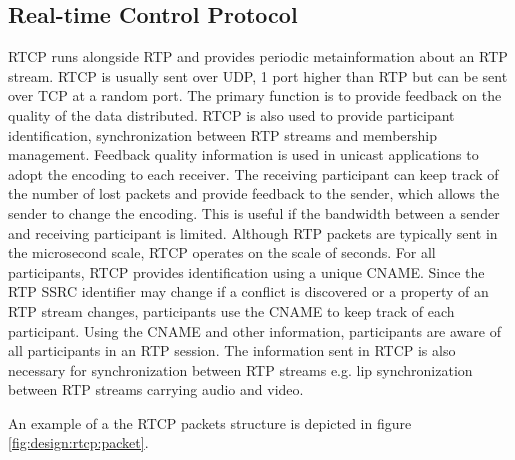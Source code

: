 \subsection{Real-time Control Protocol} \label{sec:design:rtcp}
RTCP runs alongside RTP and provides periodic metainformation about an RTP stream. RTCP is usually sent over UDP, 1 port higher than RTP but can be sent over TCP at a random port. The primary function is to provide feedback on the quality of the data distributed. RTCP is also used to provide participant identification, synchronization between RTP streams and membership management. Feedback quality information is used in unicast applications to adopt the encoding to each receiver. The receiving participant can keep track of the number of lost packets and provide feedback to the sender, which allows the sender to change the encoding. This is useful if the bandwidth between a sender and receiving participant is limited.  Although RTP packets are typically sent in the microsecond scale, RTCP operates on the scale of seconds.
For all participants, RTCP provides identification using a unique \ac{CNAME}.
Since the RTP SSRC identifier may change if a conflict is discovered or a property of an RTP stream changes, participants use the CNAME to keep track of each participant. Using the \ac{CNAME} and other information, participants are aware of all participants in an RTP session.
The information sent in RTCP is also necessary for synchronization between RTP streams e.g. lip synchronization between RTP streams carrying audio and video.

An example of a the RTCP packets structure is depicted in figure \ref{fig:design:rtcp:packet}.

